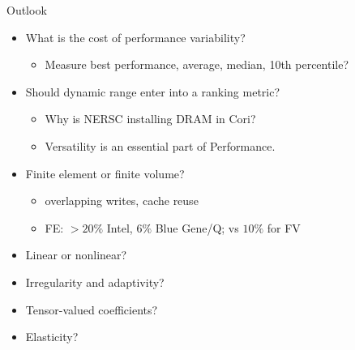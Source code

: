 \documentclass{beamer}
\begin{document}
\begin{frame}{Outlook}
  \begin{itemize}
  \item What is the cost of performance variability?
    \begin{itemize}
    \item Measure best performance, average, median, 10th percentile?
    \end{itemize}
  \item Should dynamic range enter into a ranking metric?
    \begin{itemize}
    \item Why is NERSC installing DRAM in Cori?
    \item Versatility is an essential part of Performance.
    \end{itemize}
  \item Finite element or finite volume?
    \begin{itemize}
    \item overlapping writes, cache reuse
    \item FE: $>20\%$ Intel, $6\%$ Blue Gene/Q; vs $10\%$ for FV
    \end{itemize}
  \item Linear or nonlinear?
  \item Irregularity and adaptivity?
  \item Tensor-valued coefficients?
  \item Elasticity?
  \end{itemize}
\end{frame}
\end{document}
